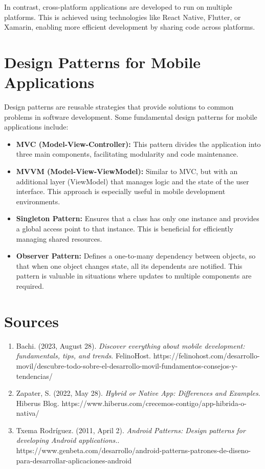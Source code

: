 \documentclass{article}
\begin{document}
In contrast, cross-platform applications are developed to run on multiple platforms. This is achieved using technologies like React Native, Flutter, or Xamarin, enabling more efficient development by sharing code across platforms.

\section{Design Patterns for Mobile Applications}

Design patterns are reusable strategies that provide solutions to common problems in software development. Some fundamental design patterns for mobile applications include:

\begin{itemize}[label=--]
    \item \textbf{MVC (Model-View-Controller):} This pattern divides the application into three main components, facilitating modularity and code maintenance.
    
    \item \textbf{MVVM (Model-View-ViewModel):} Similar to MVC, but with an additional layer (ViewModel) that manages logic and the state of the user interface. This approach is especially useful in mobile development environments.
    
    \item \textbf{Singleton Pattern:} Ensures that a class has only one instance and provides a global access point to that instance. This is beneficial for efficiently managing shared resources.
    
    \item \textbf{Observer Pattern:} Defines a one-to-many dependency between objects, so that when one object changes state, all its dependents are notified. This pattern is valuable in situations where updates to multiple components are required.
\end{itemize}

\section{Sources}

\begin{enumerate}
    \item Bachi. (2023, August 28). \textit{Discover everything about mobile development: fundamentals, tips, and trends}. FelinoHost.
    https://felinohost.com/desarrollo-movil/descubre-todo-sobre-el-desarrollo-movil-fundamentos-consejos-y-tendencias/
    
    \item Zapater, S. (2022, May 28). \textit{Hybrid or Native App: Differences and Examples}. Hiberus Blog.
    https://www.hiberus.com/crecemos-contigo/app-hibrida-o-nativa/
    
    \item Txema Rodríguez. (2011, April 2). \textit{Android Patterns: Design patterns for developing Android applications.}.
    https://www.genbeta.com/desarrollo/android-patterns-patrones-de-diseno-para-desarrollar-aplicaciones-android
\end{enumerate}
\end{document}
